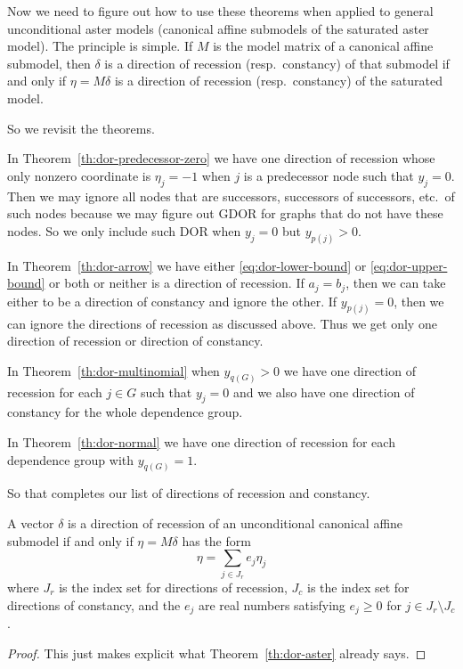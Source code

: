 Now we need to figure out how to use these theorems when applied to
general unconditional aster models (canonical affine submodels of
the saturated aster model).  The principle is simple.  If $M$ is the
model matrix of a canonical affine submodel, then $\delta$ is a direction
of recession (resp.\ constancy) of that submodel if and only
if $\eta = M \delta$ is a direction of recession (resp.\ constancy)
of the saturated model.

So we revisit the theorems.

In Theorem~\ref{th:dor-predecessor-zero} we have one direction of recession
whose only nonzero coordinate is $\eta_j = - 1$ when $j$ is a predecessor
node such that $y_j = 0$.  Then we may ignore all nodes that are successors,
successors of successors, etc.\ of such nodes because we may figure out GDOR
for graphs that do not have these nodes.  So we only include such DOR when
$y_j = 0$ but $y_{p(j)} > 0$.

In Theorem~\ref{th:dor-arrow} we have either
\eqref{eq:dor-lower-bound} or \eqref{eq:dor-upper-bound} or both or neither
is a direction of recession.  If $a_j = b_j$, then we can take either to
be a direction of constancy and ignore the other.
If $y_{p(j)} = 0$, then we can ignore the directions of recession as discussed
above.  Thus we get only one direction of recession or direction of constancy.

In Theorem~\ref{th:dor-multinomial} when $y_{q(G)} > 0$ we have one
direction of recession for each $j \in G$ such that $y_j = 0$ and
we also have one direction of constancy for the whole dependence group.

In Theorem~\ref{th:dor-normal} we have one direction of recession for
each dependence group with $y_{q(G)} = 1$.

So that completes our list of directions of recession and constancy.
\begin{theorem} \label{th:dor-aster-explicit}
A vector $\delta$ is a direction of recession
of an unconditional canonical affine submodel
if and only if $\eta = M \delta$ has the form
\begin{equation} \label{eq:dor-aster-explicit}
   \eta = \sum_{j \in J_r} e_j \eta_j
\end{equation}
where $J_r$ is the index set for directions of recession,
$J_c$ is the index set for directions of constancy, and
the $e_j$ are real numbers satisfying $e_j \ge 0$
for $j \in J_r \setminus J_c$.
\end{theorem}
\begin{proof}
This just makes explicit what Theorem~\ref{th:dor-aster} already says.
\end{proof}


